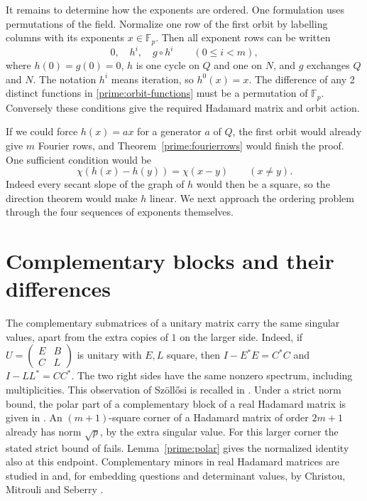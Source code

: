 \documentclass[11pt,a4paper]{article}
\numberwithin{equation}{section}
\begin{document}
It remains to determine how the exponents are ordered. One formulation uses permutations of the field. Normalize one row of the first orbit by labelling columns with its exponents $x\in\mathbb F_p$. Then all exponent rows can be written
\begin{equation}\label{prime:orbit-functions}
0,\quad h^i,\quad g\circ h^i\qquad(0\le i<m),
\end{equation}
where $h(0)=g(0)=0$, $h$ is one cycle on $Q$ and one on $N$, and $g$ exchanges $Q$ and $N$. The notation $h^i$ means iteration, so $h^0(x)=x$. The difference of any 2 distinct functions in \eqref{prime:orbit-functions} must be a permutation of $\mathbb F_p$. Conversely these conditions give the required Hadamard matrix and orbit action.

If we could force $h(x)=ax$ for a generator $a$ of $Q$, the first orbit would already give $m$ Fourier rows, and Theorem~\ref{prime:fourierrows} would finish the proof. One sufficient condition would be
\begin{equation}\label{prime:character-gap}
\chi(h(x)-h(y))=\chi(x-y)\qquad(x\ne y).
\end{equation}
Indeed every secant slope of the graph of $h$ would then be a square, so the direction theorem would make $h$ linear. We next approach the ordering problem through the four sequences of exponents themselves.

\section{Complementary blocks and their differences}\label{sec:complement}

The complementary submatrices of a unitary matrix carry the same singular values, apart from the extra copies of $1$ on the larger side. Indeed, if $U=\left(\begin{smallmatrix}E&B\\ C&L\end{smallmatrix}\right)$ is unitary with $E,L$ square, then $I-E^*E=C^*C$ and $I-LL^*=CC^*$. The two right sides have the same nonzero spectrum, including multiplicities. This observation of Sz\"oll\H{o}si is recalled in \cite[Theorem~2.3]{bns}. Under a strict norm bound, the polar part of a complementary block of a real Hadamard matrix is given in \cite[Lemma~3.2]{bns}. An $(m+1)$-square corner of a Hadamard matrix of order $2m+1$ already has norm $\sqrt p$, by the extra singular value. For this larger corner the stated strict bound of \cite[Lemma~3.2]{bns} fails. Lemma~\ref{prime:polar} gives the normalized identity also at this endpoint. Complementary minors in real Hadamard matrices are studied in \cite{kms1,kms2} and, for embedding questions and determinant values, by Christou, Mitrouli and Seberry \cite{cms18}.
\end{document}
